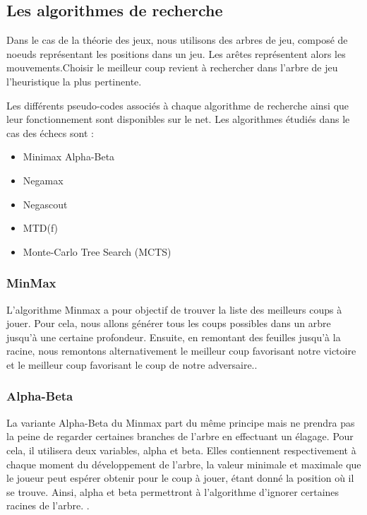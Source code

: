 \documentclass{article}
\begin{document}
\subsection{Les algorithmes de recherche}
Dans le cas de la théorie des jeux, nous utilisons des arbres de jeu, composé de noeuds représentant les positions dans un jeu. Les arêtes représentent alors les mouvements.\newline Choisir le meilleur coup revient à rechercher dans l'arbre de jeu l'heuristique la plus pertinente.

Les différents pseudo-codes associés à chaque algorithme de recherche ainsi que leur fonctionnement sont disponibles sur le net. Les algorithmes étudiés dans le cas des échecs sont :

\begin{itemize}
    \item Minimax Alpha-Beta\cite{Minmax-ab}
    \item Negamax \cite{Negamax}
    \item Negascout \cite{Negascout}
    \item MTD(f) \cite{MTD(f)}
    \item Monte-Carlo Tree Search (MCTS) \cite{MCTS}
\end{itemize}

\subsubsection{MinMax}
L'algorithme Minmax a pour objectif de trouver la liste des meilleurs coups à jouer. Pour cela, nous allons générer tous les coups possibles dans un arbre jusqu'à une certaine profondeur. Ensuite, en remontant des feuilles jusqu'à la racine, nous remontons alternativement le meilleur coup favorisant notre victoire et le meilleur coup favorisant le coup de notre adversaire.\cite{Heuristiques}.

\subsubsection{Alpha-Beta}
La variante Alpha-Beta du Minmax part du même principe mais ne prendra pas la peine de regarder certaines branches de l'arbre en effectuant un élagage. Pour cela, il utilisera deux variables, alpha et beta. Elles contiennent respectivement à chaque moment du développement de l'arbre, la valeur minimale et maximale que le joueur peut espérer obtenir pour le coup à jouer, étant donné la position où il se trouve. Ainsi, alpha et beta permettront à l'algorithme d'ignorer certaines racines de l'arbre. \cite{Heuristiques}.
\end{document}
